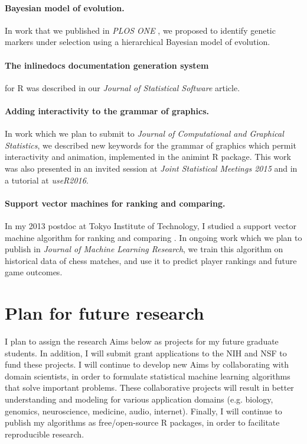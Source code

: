 \documentclass{article}
\begin{document}
\paragraph{Bayesian model of evolution.} In work that we published in
\emph{PLOS ONE} \citep{HOCKING-evolution}, we proposed to identify
genetic markers under selection using a hierarchical Bayesian model of
evolution.

\paragraph{The inlinedocs documentation generation system} for R was
described in our \emph{Journal of Statistical Software}
\citep{hocking13:inlinedocs} article.

\paragraph{Adding interactivity to the grammar of graphics.} In work
which we plan to submit to \emph{Journal of Computational and
  Graphical Statistics}, we described new keywords for the grammar of
graphics which permit interactivity and animation, implemented in the
animint R package. This work was also presented in an invited session
at \emph{Joint Statistical Meetings 2015} and in a tutorial at
\emph{useR2016}.

\paragraph{Support vector machines for ranking and comparing.} In my
2013 postdoc at Tokyo Institute of Technology, I studied a support
vector machine algorithm for ranking and comparing
\citep{svmcompare}. In ongoing work which we plan to publish in
\emph{Journal of Machine Learning Research}, we train this
algorithm on historical data of chess matches, and use it to predict
player rankings and future game outcomes.

\section{Plan for future research}

I plan to assign the research Aims below as projects for my future
graduate students. In addition, I will submit grant applications to
the NIH and NSF to fund these projects. I will continue to develop new
Aims by collaborating with domain scientists, in order to formulate
statistical machine learning algorithms that solve important
problems. These collaborative projects will result in better
understanding and modeling for various application domains
(e.g. biology, genomics, neuroscience, medicine, audio,
internet). Finally, I will continue to publish my algorithms as
free/open-source R packages, in order to facilitate reproducible
research.
\end{document}
